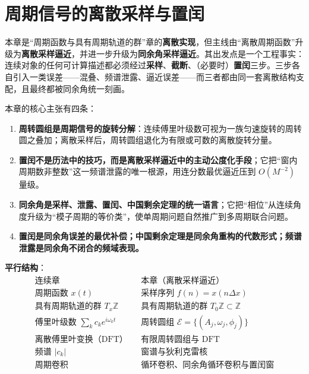 \chapter{周期信号的离散采样与置闰}
\label{chap:sampling}

\begin{remark}[本章定位与主线]\label{rem:discrete_periodic_chapter_positioning}
本章是“周期函数与具有周期轨道的群”章的\textbf{离散实现}，但主线由“离散周期函数”升级为\textbf{离散采样逼近}，并进一步升级为\textbf{同余角采样逼近}。其出发点是一个工程事实：连续对象的任何可计算描述都必须经过\textbf{采样}、\textbf{截断}、（必要时）\textbf{置闰}三步。三步各自引入一类误差——混叠、频谱泄露、逼近误差——而三者都由同一套离散结构支配，且最终都被同余角统一刻画。

本章的核心主张有四条：
\begin{enumerate}[label=(\roman*)]
    \item \textbf{周转圆组是周期信号的旋转分解}：连续傅里叶级数可视为一族匀速旋转的周转圆之叠加；离散采样后，周转圆组退化为有限或可数的离散旋转分量。
    \item \textbf{置闰不是历法中的技巧，而是离散采样逼近中的主动公度化手段}；它把“窗内周期数非整数”这一频谱泄露的唯一根源，用连分数最优逼近压到 $O(M^{-2})$ 量级。
    \item \textbf{同余角是采样、泄露、置闰、中国剩余定理的统一语言}；它把“相位”从连续角度升级为“模子周期的等价类”，使单周期问题自然推广到多周期联合问题。
    \item \textbf{置闰是同余角误差的最优补偿；中国剩余定理是同余角重构的代数形式；频谱泄露是同余角不闭合的频域表现。}
\end{enumerate}

\textbf{平行结构}：
\[
\begin{aligned}
\text{连续章} && \text{本章（离散采样逼近）} \\
\text{周期函数 } x(t) && \text{采样序列 } f(n)=x(n\Delta x) \\
\text{具有周期轨道的群 } T_x\mathbb{Z} && \text{具有周期轨道的群 } T_0\mathbb{Z}\subset\mathbb{Z} \\
\text{傅里叶级数 } \sum_k c_k e^{i\omega_k t} && \text{周转圆组 } \mathcal{E}=\{(A_j,\omega_j,\phi_j)\} \\
\text{离散傅里叶变换（DFT）} && \text{有限周转圆组与 DFT} \\
\text{频谱 } |c_k| && \text{窗谱与狄利克雷核} \\
\text{周期卷积} && \text{循环卷积、同余角循环卷积与置闰窗}
\end{aligned}
\]


\end{remark}
